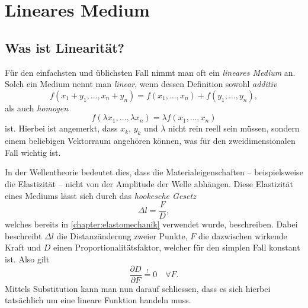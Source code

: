 %
%
%
%
\section{Lineares Medium\label{particles:section:linear}}

\subsection{Was ist Linearität?}
Für den einfachsten und üblichsten Fall nimmt man oft ein \emph{lineares Medium} an.
Solch ein Medium nennt man \emph{linear}, wenn dessen Definition sowohl \emph{additiv}
\[
    f(x_{1} + y_{1}, \ldots, x_{n} + y_{n}) 
    = 
    f(x_{1}, \ldots, x_{n}) 
    + 
    f(y_{1}, \ldots, y_{n}),
\]
als auch \emph{homogen}
\[
    f(\lambda x_{1}, \ldots, \lambda x_{n}) 
    = 
    \lambda f(x_{1}, \ldots, x_{n})
\]
ist.
Hierbei ist angemerkt, dass $x_{k}$, $y_{k}$ und $\lambda$ nicht rein reell sein müssen, 
sondern einem beliebigen Vektorraum angehören können, was für den zweidimensionalen Fall wichtig ist.

In der Wellentheorie bedeutet dies, 
dass die Materialeigenschaften -- beispielsweise die Elastizität -- nicht von der Amplitude der Welle abhängen.
Diese Elastizität eines Mediums lässt sich durch das \emph{hookesche Gesetz}
\[
    \Delta l
    = 
    \frac{F}{D}
    \label{particles:eq:hookesches-gesetz},
\]
welches bereits in \autoref{chapter:elastomechanik} verwendet wurde, beschreiben.
Dabei beschreibt $\Delta l$ die Distanzänderung zweier Punkte,
$F$ die dazwischen wirkende Kraft und $D$ einen Proportionalitätsfaktor, 
welcher für den simplen Fall konstant ist. Also gilt 
\[
    \frac{\partial D}{\partial F} 
    \overset{!}{=} 
    0 
    \quad 
    \forall F.
\]
Mittels Substitution kann man nun darauf schliessen, 
dass es sich hierbei tatsächlich um eine lineare Funktion handeln muss.

